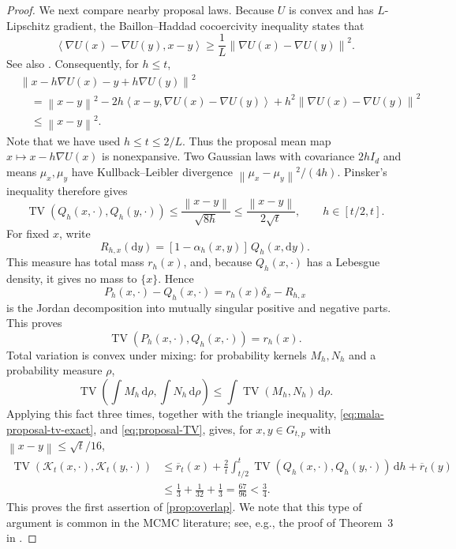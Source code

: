 \documentclass[11pt]{article}
\newcommand{\TV}{\operatorname{TV}}
\newcommand{\cK}{\mathcal K}
\newcommand{\ip}[2]{\left\langle #1,#2\right\rangle}
\newcommand{\norm}[1]{\left\lVert #1\right\rVert}
\newcommand{\1}{\mathbf 1}
\newcommand{\df}{\mathrm{d}}
\begin{document}
\begin{proof}
		We next compare nearby proposal laws.  Because $U$ is convex and has $L$-Lipschitz gradient, the Baillon--Haddad cocoercivity
		inequality states that \citep[Theorem~2.1.5]{Nesterov2004}
		\[
		\ip{\nabla U(x)-\nabla U(y)}{x-y}
		\geq
		\frac1L\norm{\nabla U(x)-\nabla U(y)}^2.
		\]
		See also \citet{BauschkeCombettes2010}.
		Consequently, for \(h\leq t\),
		\[
		\begin{aligned}
			&\norm{x-h\nabla U(x)-y+h\nabla U(y)}^2\\
			&\quad=\norm{x-y}^2
			-2h\ip{x-y}{\nabla U(x)-\nabla U(y)}
			+h^2\norm{\nabla U(x)-\nabla U(y)}^2\\
			&\quad\leq\norm{x-y}^2.
		\end{aligned}
		\]
		Note that we have used $h \leq t \leq 2/L$.
		Thus the proposal mean map $x \mapsto x - h \nabla U(x)$ is nonexpansive.  Two Gaussian laws with
		covariance \(2hI_d\) and means \(\mu_x,\mu_y\) have Kullback--Leibler
		divergence \(\norm{\mu_x-\mu_y}^2/(4h)\).  Pinsker's inequality
		\citep[Lemma~2.5]{Tsybakov2009} therefore gives
		\begin{equation}\label{eq:proposal-TV}
			\TV(Q_h(x,\cdot),Q_h(y,\cdot))
			\leq
			\frac{\norm{x-y}}{\sqrt{8h}}
			\leq
			\frac{\norm{x-y}}{2\sqrt{t}},
			\qquad h\in[t/2,t].
		\end{equation}
		For fixed \(x\), write
		\[
		R_{h,x}(\df y)=[1-\alpha_h(x,y)] \, Q_h(x,\df y).
		\]
		This measure has total mass \(r_h(x)\), and, because \(Q_h(x,\cdot)\) has
		a Lebesgue density, it gives no mass to \(\{x\}\).  Hence
		\[
		P_h(x,\cdot)-Q_h(x,\cdot)
		=r_h(x)\delta_x-R_{h,x}
		\]
		is the Jordan decomposition into mutually singular positive and negative
		parts.  This proves
		\begin{equation}\label{eq:mala-proposal-tv-exact}
			\TV(P_h(x,\cdot),Q_h(x,\cdot))=r_h(x).
		\end{equation}
		Total variation is convex under mixing: for probability kernels
		\(M_h,N_h\) and a probability measure \(\rho\),
		\[
		\TV\left(\int M_h\,\df\rho,\int N_h\,\df\rho\right)
		\leq\int\TV(M_h,N_h)\,\df\rho.
		\]
		Applying this fact three times, together with the triangle inequality,
		\eqref{eq:mala-proposal-tv-exact}, and \eqref{eq:proposal-TV}, gives, for
		\(x,y\in G_{t,p}\) with \(\norm{x-y}\leq\sqrt{t}/16\),
		\begin{align*}
			\TV(\cK_t(x,\cdot),\cK_t(y,\cdot))
			&\leq\overline r_t(x)
			+\frac2t\int_{t/2}^t
			\TV(Q_h(x,\cdot),Q_h(y,\cdot))\,\df h
			+\overline r_t(y)\\
			&\leq\frac13+\frac1{32}+\frac13
			=\frac{67}{96}<\frac34.
		\end{align*}
		This proves the first assertion of \cref{prop:overlap}.
		We note that this type of argument is common in the MCMC literature; see, e.g., the proof of Theorem~3 in \cite{WuSchmidlerChen2022}.
		

\end{proof}
\end{document}
